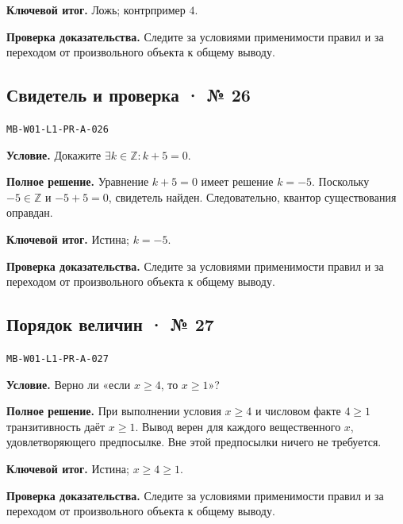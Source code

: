 \documentclass[11pt,a4paper,openany]{book}
\newcommand{\muid}[1]{\texttt{\footnotesize #1}}
\begin{document}
\begin{learnbox}\textbf{Ключевой итог.} Ложь; контрпример $4$.\par \textbf{Проверка доказательства.} 
Следите за условиями применимости правил и за переходом от произвольного объекта к общему выводу. 
\end{learnbox}

\subsection*{Свидетель и проверка · № 26}\hypertarget{solution:MB-W01-L1-PR-A-026}{}

\muid{MB-W01-L1-PR-A-026}\par

\textbf{Условие.} Докажите $\exists k\in\mathbb Z\colon k+5=0$.\par

\textbf{Полное решение.} Уравнение $k+5=0$ имеет решение $k=-5$. Поскольку $-5\in\mathbb Z$ и $-5+5=0$, свидетель найден. Следовательно, квантор существования оправдан.


\begin{learnbox}\textbf{Ключевой итог.} Истина; $k=-5$.\par \textbf{Проверка доказательства.} 
Следите за условиями применимости правил и за переходом от произвольного объекта к общему выводу. 
\end{learnbox}

\subsection*{Порядок величин · № 27}\hypertarget{solution:MB-W01-L1-PR-A-027}{}

\muid{MB-W01-L1-PR-A-027}\par

\textbf{Условие.} Верно ли «если $x\ge4$, то $x\ge1$»?\par

\textbf{Полное решение.} При выполнении условия $x\ge4$ и числовом факте $4\ge1$ транзитивность даёт $x\ge1$. Вывод верен для каждого вещественного $x$, удовлетворяющего предпосылке. Вне этой предпосылки ничего не требуется.


\begin{learnbox}\textbf{Ключевой итог.} Истина; $x\ge4\ge1$.\par \textbf{Проверка доказательства.} 
Следите за условиями применимости правил и за переходом от произвольного объекта к общему выводу. 
\end{learnbox}
\end{document}

